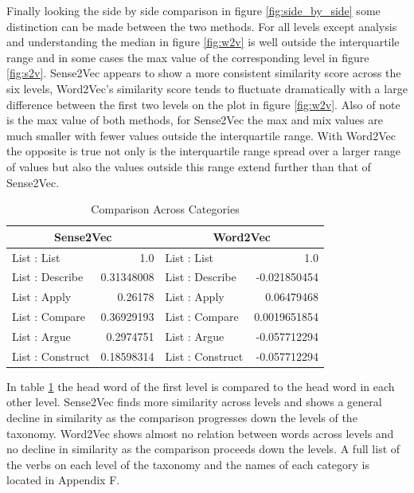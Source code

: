 \noindent
Finally looking the side by side comparison in figure \ref{fig:side_by_side} some distinction can be made between the two methods. For all levels except analysis and understanding the median in figure \ref{fig:w2v} is well outside the interquartile range and in some cases the max value of the corresponding level in figure \ref{fig:s2v}. Sense2Vec appears to show a more consistent similarity score across the six levels, Word2Vec's similarity score tends to fluctuate dramatically with a large difference between the first two levels on the plot in figure \ref{fig:w2v}. Also of note is the max value of both methods, for Sense2Vec the max and mix values are much smaller with fewer values outside the interquartile range. With Word2Vec the opposite is true not only is the interquartile range spread over a larger range of values but also the values outside this range extend further than that of Sense2Vec.

\begin{table}[H]
\centering
\begin{tabular}{|l|r|l|r|}
\hline
\multicolumn{2}{|c|}{Sense2Vec} & \multicolumn{2}{c|}{Word2Vec}   \\ \hline
List : List       & 1.0         & List : List      & 1.0          \\ \hline
List : Describe   & 0.31348008  & List : Describe  & -0.021850454 \\ \hline
List : Apply      & 0.26178     & List : Apply     & 0.06479468   \\ \hline
List : Compare    & 0.36929193  & List : Compare   & 0.0019651854 \\ \hline
List : Argue      & 0.2974751   & List : Argue     & -0.057712294 \\ \hline
List : Construct  & 0.18598314  & List : Construct & -0.057712294 \\ \hline
\end{tabular}
\caption{Comparison Across Categories}
\label{head_head_comp}
\end{table}

\noindent
In table \ref{head_head_comp} the head word of the first level is compared to the head word in each other level. Sense2Vec finds more similarity across levels and shows a general decline in similarity as the comparison progresses down the levels of the taxonomy. Word2Vec shows almost no relation between words across levels and no decline in similarity as the comparison proceeds down the levels. A full list of the verbs on each level of the taxonomy and the names of each category is located in Appendix F.
